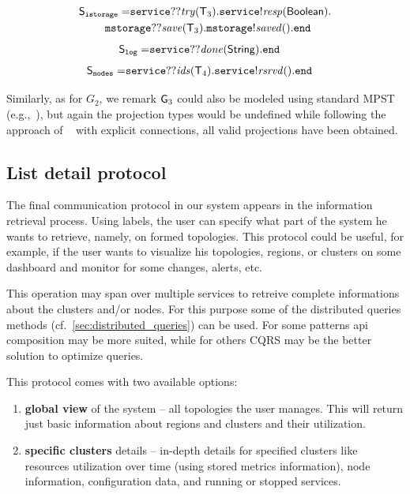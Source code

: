 \begin{align*}
	\ST_\mathtt{istorage} =  &
	\mathtt{service}{??}\mathit{try}(\T_3).\mathtt{service}{!}\mathit{resp}(\mathsf{Boolean}).\\ & \hspace{-8mm}
	\mathtt{mstorage}{??}\mathit{save}(\T_3).\mathtt{mstorage}{!}\mathit{saved}().\tend
\end{align*}
\begin{align*}
	{\mathsf S}_\mathtt{log} =  &
	\mathtt{service}{??}\mathit{done}(\mathsf{String}).\mathtt{end}
\end{align*}
\begin{align*}
	{\mathsf S}_\mathtt{nodes} =  &
	\mathtt{service}{??}\mathit{ids}({\mathsf T}_4).\mathtt{service}{!}\mathit{rsrvd}().\mathtt{end}
\end{align*}

\noindent
Similarly, as for $G_2$, we remark ${\sf G}_3$ could also be modeled using standard MPST (e.g.,~\cite{HondaYC08}), but again the projection types would be undefined while following the approach of ~\cite{HuY17} with explicit connections, all valid projections have been obtained.
%
%
\subsection{List detail protocol}\label{sec:list_detail_protocol}
%
The final communication protocol in our system appears in the information retrieval process. Using labels, the user can specify what part of the system he wants to retrieve, namely, on formed topologies. This protocol could be useful, for example, if the user wants to visualize his topologies, regions, or clusters on some dashboard and monitor for some changes, alerts, etc. 

This operation may span over multiple services to retreive complete informations about the clusters and/or nodes. For this purpose some of the distributed queries methods (cf.~\ref{sec:distributed_queries}) can be used. For some patterns api composition may be more suited, while for others CQRS may be the better solution to optimize queries.

This protocol comes with two available options: 

\begin{enumerate}[start=1,label={(\bfseries \arabic*)}]
	\item \textbf{global view} of the system -- all topologies the user manages. This will return just basic information about regions and clusters and their utilization.
	\item \textbf{specific clusters} details -- in-depth details for specified clusters like resources utilization over time (using stored metrics information), node information, configuration data, and running or stopped services.
\end{enumerate}

